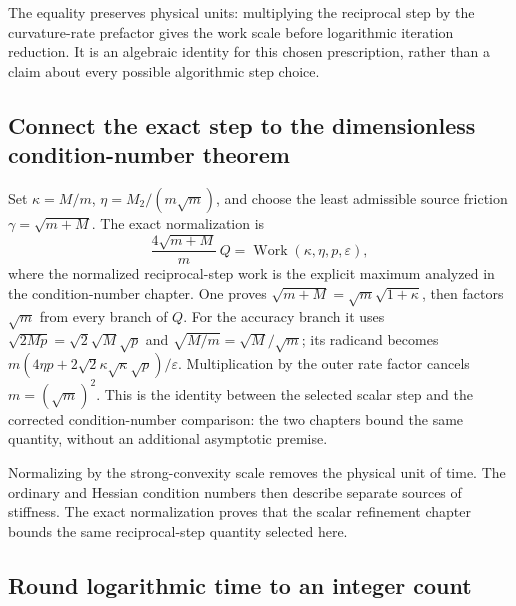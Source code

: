 \documentclass[11pt,a4paper]{report}
\begin{document}
The equality preserves physical units: multiplying the reciprocal step by the curvature-rate prefactor gives the work scale before logarithmic iteration reduction. It is an algebraic identity for this chosen prescription, rather than a claim about every possible algorithmic step choice.

\subsection{\texorpdfstring{Connect the exact step to the dimensionless condition-number theorem}{Connect the exact step to the dimensionless condition-number theorem}}
\label{report-step-KineticLangevin-SecondOrderComplexity-lean-4}


Set \(\kappa=M/m\), \(\eta=M_2/(m\sqrt m)\), and choose the least admissible source friction \(\gamma=\sqrt{m+M}\). The exact normalization is \[\frac{4\sqrt{m+M}}{m}\,Q=\operatorname{Work}(\kappa,\eta,p,\varepsilon),\] where the normalized reciprocal-step work is the explicit maximum analyzed in the condition-number chapter. One proves \(\sqrt{m+M}=\sqrt m\sqrt{1+\kappa}\), then factors \(\sqrt m\) from every branch of \(Q\). For the accuracy branch it uses \(\sqrt{2Mp}=\sqrt2\sqrt M\sqrt p\) and \(\sqrt{M/m}=\sqrt M/\sqrt m\); its radicand becomes \(m(4\eta p+2\sqrt2\kappa\sqrt\kappa\sqrt p)/\varepsilon\). Multiplication by the outer rate factor cancels \(m=(\sqrt m)^2\). This is the identity between the selected scalar step and the corrected condition-number comparison: the two chapters bound the same quantity, without an additional asymptotic premise.



Normalizing by the strong-convexity scale removes the physical unit of time. The ordinary and Hessian condition numbers then describe separate sources of stiffness. The exact normalization proves that the scalar refinement chapter bounds the same reciprocal-step quantity selected here.

\subsection{\texorpdfstring{Round logarithmic time to an integer count}{Round logarithmic time to an integer count}}
\label{report-step-KineticLangevin-SecondOrderComplexity-lean-5}
\end{document}
